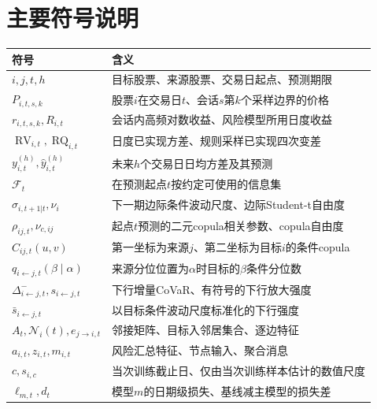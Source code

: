 \documentclass[UTF8,zihao=-4,oneside,openany,fontset=fandol]{ctexbook}
\numberwithin{equation}{chapter}
\newcommand{\RV}{\operatorname{RV}}
\newcommand{\RQ}{\operatorname{RQ}}
\newcommand{\F}{\mathcal F}
\begin{document}
\chapter*{主要符号说明}
\begin{longtable}{p{}p{}}
\toprule 符号 & 含义\\\midrule\endhead
$i,j,t,h$ & 目标股票、来源股票、交易日起点、预测期限\\
$P_{i,t,s,k}$ & 股票$i$在交易日$t$、会话$s$第$k$个采样边界的价格\\
$r_{i,t,s,k},R_{i,t}$ & 会话内高频对数收益、风险模型所用日度收益\\
$\RV_{i,t},\RQ_{i,t}$ & 日度已实现方差、规则采样已实现四次变差\\
$y^{(h)}_{i,t},\widehat y^{(h)}_{i,t}$ & 未来$h$个交易日日均方差及其预测\\
$\F_t$ & 在预测起点$t$按约定可使用的信息集\\
$\sigma_{i,t+1|t},\nu_i$ & 下一期边际条件波动尺度、边际Student-t自由度\\
$\rho_{ij,t},\nu_{c,ij}$ & 起点$t$预测的二元copula相关参数、copula自由度\\
$C_{ij,t}(u,v)$ & 第一坐标为来源$j$、第二坐标为目标$i$的条件copula\\
$q_{i\leftarrow j,t}(\beta\mid\alpha)$ & 来源分位位置为$\alpha$时目标的$\beta$条件分位数\\
$\Delta^-_{i\leftarrow j,t},s_{i\leftarrow j,t}$ & 下行增量CoVaR、有符号的下行放大强度\\
$\bar s_{i\leftarrow j,t}$ & 以目标条件波动尺度标准化的下行强度\\
$A_t,\mathcal N_i(t),e_{j\to i,t}$ & 邻接矩阵、目标入邻居集合、逐边特征\\
$a_{i,t},z_{i,t},m_{i,t}$ & 风险汇总特征、节点输入、聚合消息\\
$c,s_{i,c}$ & 当次训练截止日、仅由当次训练样本估计的数值尺度\\
$\ell_{m,t},d_t$ & 模型$m$的日期级损失、基线减主模型的损失差\\
\bottomrule
\end{longtable}
\mainmatter






\printbibliography[heading=bibintoc,title={参考文献}]
\appendix

\end{document}
